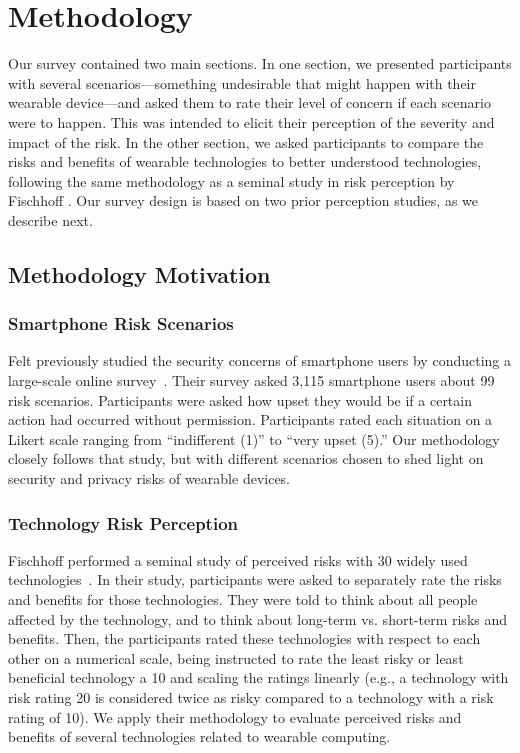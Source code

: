 \section{Methodology}

Our survey contained two main sections.
In one section, we presented participants with several scenarios---something undesirable that might happen with their wearable device---and asked them to rate their level of concern if each scenario were to happen.
This was intended to elicit their perception of the severity and impact of the risk.
In the other section, we asked participants to compare the risks and benefits of wearable technologies to better understood technologies, following the same methodology as a seminal study in risk perception by Fischhoff \etal \cite{Fischhoff}.
Our survey design is based on two prior perception studies, as we describe next.

\subsection{Methodology Motivation}
\subsubsection{Smartphone Risk Scenarios}
Felt \etal previously studied the security concerns of smartphone users by conducting a large-scale online survey~\cite{Felt}. Their survey asked 3,115 smartphone users about 99 risk scenarios. Participants were asked how upset they would be if a certain action had occurred without permission. Participants rated each situation on a Likert scale ranging from ``indifferent (1)'' to ``very upset (5).''
Our methodology closely follows that study, but with different scenarios chosen to shed light on security and privacy risks of wearable devices.

\subsubsection{Technology Risk Perception}
Fischhoff \etal performed a seminal study of perceived risks with 30 widely used technologies~\cite{Fischhoff}. In their study, participants were asked to separately rate the risks and benefits for those technologies. They were told to think about all people affected by the technology, and to think about long-term vs. short-term risks and benefits. Then, the participants rated these technologies with respect to each other on a numerical scale, being instructed to rate the least risky or least beneficial technology a 10 and scaling the ratings linearly (e.g., a technology with risk rating 20 is considered twice as risky compared to a technology with a risk rating of 10).
We apply their methodology to evaluate perceived risks and benefits of several technologies related to wearable computing.

